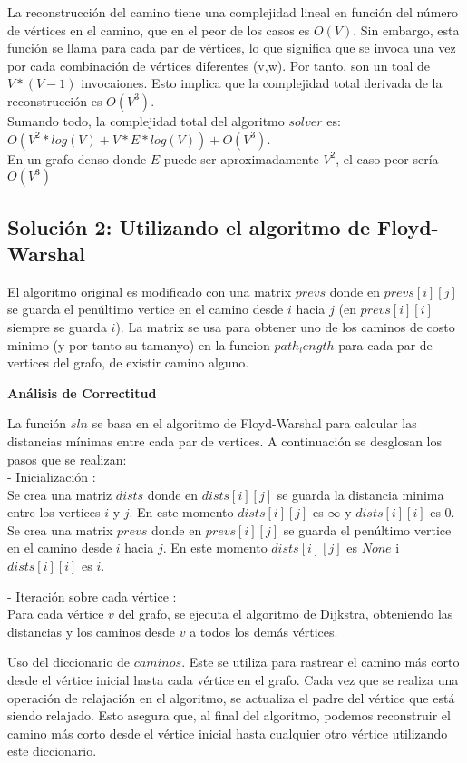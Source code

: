\documentclass[
10pt, %
a4paper, %
oneside, %
headinclude,footinclude, %
BCOR5mm, %
]{scrartcl}
\begin{document}
La reconstrucción del camino tiene una complejidad lineal en función del número de vértices en el camino, que en el peor 
de los casos es $O(V)$. Sin embargo, esta función se llama para cada par de vértices, lo que significa que se invoca una vez por cada 
combinación de vértices diferentes (v,w). Por tanto, son un toal de $V*(V-1)$ invocaiones. Esto implica que la complejidad total derivada de la 
reconstrucción es $O(V^3)$. \\

Sumando todo, la complejidad total del algoritmo $solver$ es: $O(V^2 * log(V) + V * E*log(V) ) + O(V^3)$. \\

En un grafo denso donde $E$ puede ser aproximadamente $V^2$, el caso peor sería $O(V^3)$


\subsection{Solución 2: Utilizando el algoritmo de Floyd-Warshal}

El algoritmo original es modificado con una matrix $prevs$ donde en $prevs[i][j]$ se guarda el penúltimo vertice en el camino desde $i$ hacia $j$ (en $prevs[i][i]$ siempre se guarda $i$).
La matrix se usa para obtener uno de los caminos de costo minimo (y por tanto su tamanyo) en la funcion $path_length$ para cada par de vertices del grafo, de existir camino alguno.


\textbf{Análisis de Correctitud}

La función $sln$ se basa en el algoritmo de Floyd-Warshal para calcular las distancias mínimas entre cada par de vertices. A continuación se desglosan los pasos que se realizan:\\


- Inicialización :\\
Se crea una matriz $dists$ donde en $dists[i][j]$ se guarda la distancia minima entre los vertices $i$ y $j$. En este momento $dists[i][j]$ es $\infty$ y $dists[i][i]$ es $0$.
Se crea una matrix $prevs$ donde en $prevs[i][j]$ se guarda el penúltimo vertice en el camino desde $i$ hacia $j$. En este momento $dists[i][j]$ es $None$ i $dists[i][i]$ es $i$.


- Iteración sobre cada vértice :\\ 
Para cada vértice $v$ del grafo, se ejecuta el algoritmo de Dijkstra, obteniendo las distancias y los caminos desde $v$
a todos los demás vértices.

Uso del diccionario de $caminos$. Este se utiliza para rastrear el camino más corto desde el vértice inicial hasta cada 
vértice en el grafo. Cada vez que se realiza una operación de relajación en el algoritmo, se actualiza el padre del vértice 
que está siendo relajado. Esto asegura que, al final del algoritmo, podemos reconstruir el camino más corto desde el vértice inicial
hasta cualquier otro vértice utilizando este diccionario.
\end{document}
